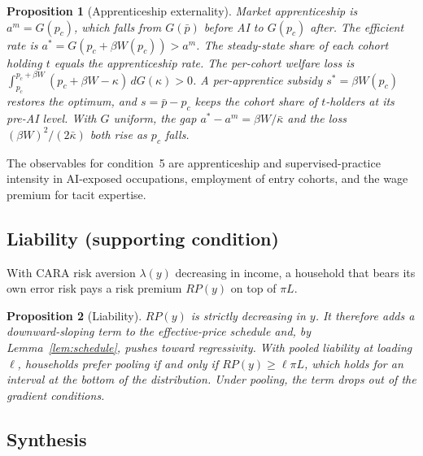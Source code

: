 \documentclass[12pt]{article}
\newtheorem{proposition}{Proposition}
\theoremstyle{remark}
\begin{document}
\begin{proposition}[Apprenticeship externality]\label{prop:apprentice}
Market apprenticeship is $a^m=G(p_c)$, which falls from $G(\bar p)$ before AI to $G(p_c)$ after. The efficient rate is $a^*=G(p_c+\beta W(p_c))>a^m$. The steady-state share of each cohort holding $t$ equals the apprenticeship rate. The per-cohort welfare loss is $\int_{p_c}^{p_c+\beta W}(p_c+\beta W-\kappa)\,dG(\kappa)>0$. A per-apprentice subsidy $s^*=\beta W(p_c)$ restores the optimum, and $s=\bar p-p_c$ keeps the cohort share of $t$-holders at its pre-AI level. With $G$ uniform, the gap $a^*-a^m=\beta W/\bar\kappa$ and the loss $(\beta W)^2/(2\bar\kappa)$ both rise as $p_c$ falls.
\end{proposition}

The observables for condition~5 are apprenticeship and supervised-practice intensity in AI-exposed occupations, employment of entry cohorts, and the wage premium for tacit expertise.

\subsection{Liability (supporting condition)}\label{sec:liability}

With CARA risk aversion $\lambda(y)$ decreasing in income, a household that bears its own error risk pays a risk premium $RP(y)$ on top of $\pi L$.

\begin{proposition}[Liability]\label{prop:liability}
$RP(y)$ is strictly decreasing in $y$. It therefore adds a downward-sloping term to the effective-price schedule and, by Lemma~\ref{lem:schedule}, pushes toward regressivity. With pooled liability at loading $\ell$, households prefer pooling if and only if $RP(y)\ge\ell\pi L$, which holds for an interval at the bottom of the distribution. Under pooling, the term drops out of the gradient conditions.
\end{proposition}

\subsection{Synthesis}\label{sec:synthesis}
\end{document}
